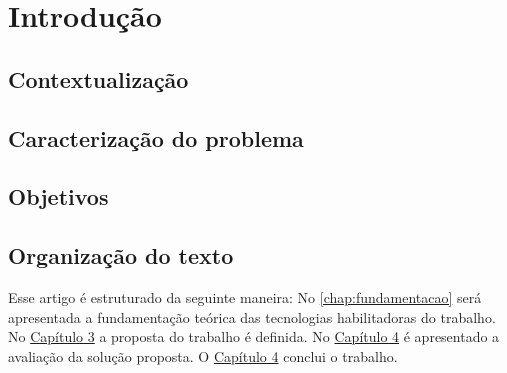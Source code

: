 \chapter{Introdução}

\section{Contextualização}

\Blindtext[2]

\section{Caracterização do problema}

\Blindtext[3]

\section{Objetivos}

\Blindtext[2]

\section{Organização do texto}

Esse artigo é estruturado da seguinte maneira: No \autoref{chap:fundamentacao} será apresentada a fundamentação teórica das tecnologias habilitadoras do trabalho. No \underline{Capítulo 3} a proposta do trabalho é definida. No \underline{Capítulo 4} é apresentado a avaliação da solução proposta. O \underline{Capítulo 4} conclui o trabalho.

